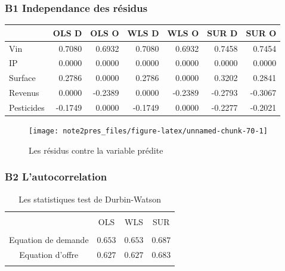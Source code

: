 \documentclass[11pt,]{article}
\begin{document}
\hypertarget{b1-independance-des-residus}{%
\subsubsection{B1 Independance des
résidus}\label{b1-independance-des-residus}}

\FloatBarrier

\begin{longtable}[]{@{}lrrrrrr@{}}
\toprule
& OLS D & OLS O & WLS D & WLS O & SUR D & SUR O\tabularnewline
\midrule
\endhead
Vin & 0.7080 & 0.6932 & 0.7080 & 0.6932 & 0.7458 & 0.7454\tabularnewline
IP & 0.0000 & 0.0000 & 0.0000 & 0.0000 & 0.0000 & 0.0000\tabularnewline
Surface & 0.2786 & 0.0000 & 0.2786 & 0.0000 & 0.3202 &
0.2841\tabularnewline
Revenus & 0.0000 & -0.2389 & 0.0000 & -0.2389 & -0.2793 &
-0.3067\tabularnewline
Pesticides & -0.1749 & 0.0000 & -0.1749 & 0.0000 & -0.2277 &
-0.2021\tabularnewline
\bottomrule
\end{longtable}

\FloatBarrier

\FloatBarrier

\begin{figure}[!htbp]

{\centering \texttt{[image: note2pres\_files/figure-latex/unnamed-chunk-70-1]} 

}

\caption{Les résidus contre la variable prédite}\label{fig:unnamed-chunk-70}
\end{figure}

\FloatBarrier

\hypertarget{b2-lautocorrelation}{%
\subsubsection{B2 L'autocorrelation}\label{b2-lautocorrelation}}

\FloatBarrier

\begin{table}[!htbp] \centering 
  \caption{Les statistiques test de Durbin-Watson} 
  \label{} 
\begin{tabular}{@{\extracolsep{5pt}} cccc} 
\\[-1.8ex]\hline 
\hline \\[-1.8ex] 
 & OLS & WLS & SUR \\ 
\hline \\[-1.8ex] 
Equation de demande & $0.653$ & $0.653$ & $0.687$ \\ 
Equation d'offre & $0.627$ & $0.627$ & $0.683$ \\ 
\hline \\[-1.8ex] 
\end{tabular} 
\end{table}
\end{document}
